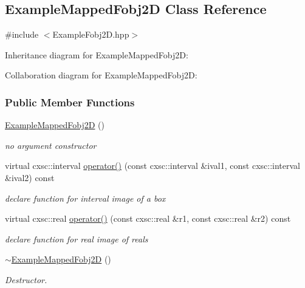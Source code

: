 \hypertarget{classExampleMappedFobj2D}{\subsection{\-Example\-Mapped\-Fobj2\-D \-Class \-Reference}
\label{classExampleMappedFobj2D}
}


{\ttfamily \#include $<$\-Example\-Fobj2\-D.\-hpp$>$}



\-Inheritance diagram for \-Example\-Mapped\-Fobj2\-D\-:


\-Collaboration diagram for \-Example\-Mapped\-Fobj2\-D\-:
\subsubsection*{\-Public \-Member \-Functions}
\begin{DoxyCompactItemize}
\item 
\hyperlink{classExampleMappedFobj2D_a03b06ac83d73097700ff33be2d470e2e}{\-Example\-Mapped\-Fobj2\-D} ()
\begin{DoxyCompactList}\small\item\em no argument constructor \end{DoxyCompactList}\item 
virtual cxsc\-::interval \hyperlink{classExampleMappedFobj2D_a073ec1eb8660c134d8b227c664199ee1}{operator()} (const cxsc\-::interval \&ival1, const cxsc\-::interval \&ival2) const 
\begin{DoxyCompactList}\small\item\em declare function for interval image of a box \end{DoxyCompactList}\item 
virtual cxsc\-::real \hyperlink{classExampleMappedFobj2D_a434c6a9f4b933698d9f54cae2a25377d}{operator()} (const cxsc\-::real \&r1, const cxsc\-::real \&r2) const 
\begin{DoxyCompactList}\small\item\em declare function for real image of reals \end{DoxyCompactList}\item 
\hyperlink{classExampleMappedFobj2D_a1a164941724d4c8c849b557b04b80769}{$\sim$\-Example\-Mapped\-Fobj2\-D} ()
\begin{DoxyCompactList}\small\item\em \-Destructor. \end{DoxyCompactList}\end{DoxyCompactItemize}



